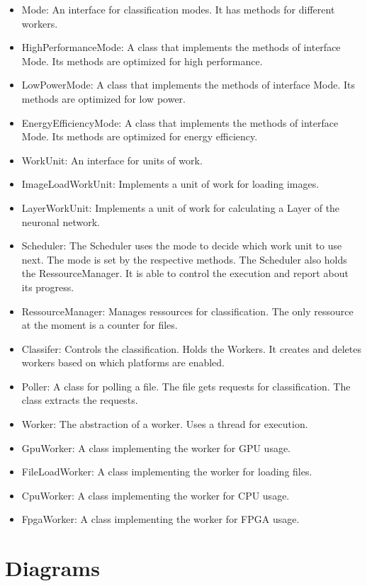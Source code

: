 \documentclass[parskip=full]{scrartcl}
\begin{document}
\begin{itemize}
\begin{itemize}
	\item Mode: An interface for classification modes. It has methods for different workers.
	\item HighPerformanceMode: A class that implements the methods of interface Mode. Its methods are optimized for high performance.
	\item LowPowerMode: A class that implements the methods of interface Mode. Its methods are optimized for low power.
	\item EnergyEfficiencyMode: A class that implements the methods of interface Mode. Its methods are optimized for energy efficiency.
	\item WorkUnit: An interface for units of work.
	\item ImageLoadWorkUnit: Implements a unit of work for loading images.
	\item LayerWorkUnit: Implements a unit of work for calculating a Layer of the neuronal network.
	\item Scheduler: The Scheduler uses the mode to decide which work unit to use next. The mode is set by the respective methods. The Scheduler also holds the RessourceManager. It is able to control the execution and report about its progress.
	\item RessourceManager: Manages ressources for classification. The only ressource at the moment is a counter for files.
	\item Classifer: Controls the classification. Holds the Workers. It creates and deletes workers based on which platforms are enabled.
	\item Poller: A class for polling a file. The file gets requests for classification. The class extracts the requests.
	\item Worker: The abstraction of a worker. Uses a thread for execution.
	\item GpuWorker: A class implementing the worker for GPU usage.
	\item FileLoadWorker: A class implementing the worker for loading files.
	\item CpuWorker: A class implementing the worker for CPU usage.
	\item FpgaWorker: A class implementing the worker for FPGA usage.
\end{itemize}



\pagebreak



\section {Diagrams}


\end{itemize}
\end{document}
